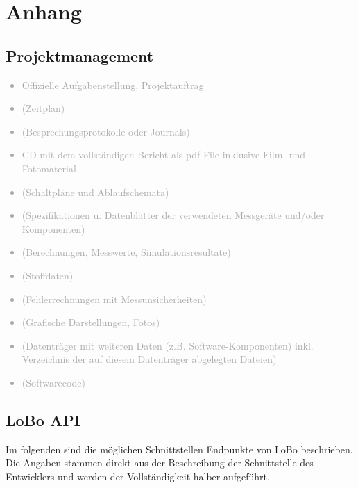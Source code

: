 
\appendix
\chapter{Anhang}
\label{sec:Anhang}

\section{Projektmanagement}\label{projektmanagement}

\textcolor{darkgray}{
  \begin{itemize}
  \item Offizielle Aufgabenstellung, Projektauftrag
  \item (Zeitplan)
  \item (Besprechungsprotokolle oder Journals)
  \item CD mit dem vollständigen Bericht als pdf-File inklusive Film- und Fotomaterial
  \item (Schaltpläne und Ablaufschemata)
  \item (Spezifikationen u. Datenblätter der verwendeten Messgeräte und/oder Komponenten)
  \item (Berechnungen, Messwerte, Simulationsresultate)
  \item (Stoffdaten)
  \item (Fehlerrechnungen mit Messunsicherheiten)
  \item (Grafische Darstellungen, Fotos)
  \item (Datenträger mit weiteren Daten (z.B. Software-Komponenten) inkl. Verzeichnis der auf diesem Datenträger abgelegten Dateien)
  \item (Softwarecode)
  \end{itemize}
}

\newpage{}

\section{LoBo API}
\label{sec:loboAPI}
Im folgenden sind die möglichen Schnittstellen Endpunkte von LoBo beschrieben. Die Angaben stammen direkt aus der Beschreibung der Schnittstelle des Entwicklers und werden der Vollständigkeit halber aufgeführt.

